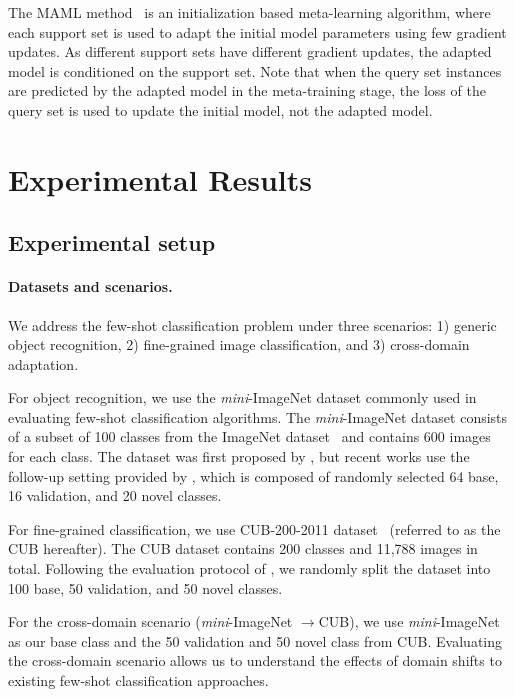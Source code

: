 The MAML method~\cite{finn2017model} is an initialization based meta-learning algorithm, where each support set is used to adapt the initial model parameters using few gradient updates. As different support sets have different gradient updates, the adapted model is conditioned on the support set. Note that when the query set instances are predicted by the adapted model in the meta-training stage, the loss of the query set is used to update the initial model, not the adapted model.

\section{Experimental Results}
\label{sec:results}

\subsection{Experimental setup}
\label{sec:setup}

\paragraph{Datasets and scenarios.} We address the few-shot classification problem under three scenarios: 1) generic object recognition, 2) fine-grained image classification, and 3) cross-domain adaptation.

For object recognition, we use the \emph{mini}-ImageNet  dataset commonly used in evaluating few-shot classification algorithms. The \emph{mini}-ImageNet  dataset consists of a subset of 100 classes from the ImageNet dataset~\cite{deng2009imagenet} and contains 600 images for each class. The dataset was first proposed by \cite{vinyals2016matching}, but recent works use the follow-up setting provided by \cite{ravi2017optimization}, which is composed of randomly selected 64 base, 16 validation, and 20 novel classes.

For fine-grained classification, we use CUB-200-2011 dataset~\cite{wah2011caltech} (referred to as the CUB hereafter). The CUB dataset contains 200 classes and 11,788 images in total. Following the evaluation protocol of \cite{hilliard2018few}, we randomly split the dataset into 100 base, 50 validation, and 50 novel classes. 

For the cross-domain scenario (\emph{mini}-ImageNet $\rightarrow$CUB), we use \emph{mini}-ImageNet  as our base class and the 50 validation and 50 novel class from CUB. Evaluating the cross-domain scenario allows us to understand the effects of domain shifts to existing few-shot classification approaches.

